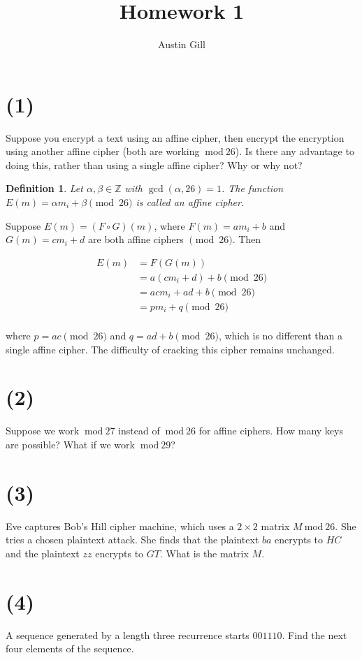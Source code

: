 \documentclass[12pt]{article}
\title{Homework 1}
\author{Austin Gill}
\renewcommand{\mod}[1]{\ \mathrm{mod}\ #1}
\newtheorem*{defn}{Definition}
\begin{document}
\maketitle

\section*{(1)} Suppose you encrypt a text using an affine cipher, then encrypt the encryption using
another affine cipher (both are working $\mod{26}$). Is there any advantage to doing this,
rather than using a single affine cipher? Why or why not?

\begin{defn}
Let $\alpha , \beta \in \mathbb Z$ with $\gcd(\alpha , 26) = 1$. The function $E(m) = \alpha m_i + \beta \pmod{26}$ is called an affine cipher.
\end{defn}

Suppose $E(m) = (F \circ G)(m)$, where $F(m) = am_i + b$ and $G(m) = cm_i + d$ are both affine ciphers $\pmod{26}$. Then

\begin{align*}
    E(m) &= F(G(m))\\
         &= a(cm_i + d) + b \pmod{26}\\
         &= acm_i + ad + b \pmod{26}\\
         &= pm_i + q \pmod{26}\\
\end{align*}

where $p = ac \pmod{26}$ and $q = ad + b \pmod{26}$, which is no different than a single affine cipher. The difficulty of cracking this cipher remains unchanged.

\section*{(2)} Suppose we work $\mod{27}$ instead of $\mod{26}$ for affine ciphers. How many keys are
possible? What if we work $\mod{29}$?

\section*{(3)} Eve captures Bob’s Hill cipher machine, which uses a $2\times2$ matrix $M \mod{26}$. She tries a chosen plaintext attack. She finds that the plaintext $ba$ encrypts to $HC$ and the plaintext $zz$ encrypts to $GT$. What is the matrix $M$.

\section*{(4)} A sequence generated by a length three recurrence starts $001110$. Find the next four
elements of the sequence.
\end{document}
